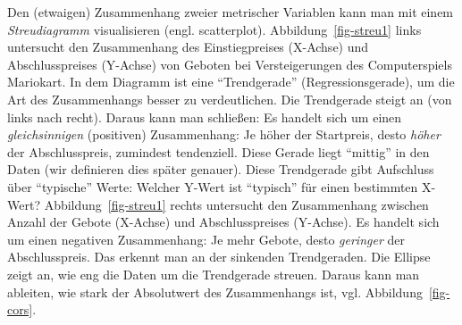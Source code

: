 \documentclass[
  letterpaper,
  oneside,
  open=any]{scrbook}
\theoremstyle{definition}
\theoremstyle{definition}
\theoremstyle{definition}
\theoremstyle{remark}
\begin{document}
Den (etwaigen) Zusammenhang zweier metrischer Variablen kann man mit
einem \emph{Streudiagramm} visualisieren (engl. scatterplot).
Abbildung~\ref{fig-streu1} links untersucht den Zusammenhang des
Einstiegpreises (X-Achse) und Abschlusspreises (Y-Achse) von Geboten bei
Versteigerungen des Computerspiels Mariokart. In dem Diagramm ist eine
\enquote{Trendgerade} (Regressionsgerade), um die Art des Zusammenhangs
besser zu verdeutlichen. Die Trendgerade steigt an (von links nach
recht). Daraus kann man schließen: Es handelt sich um einen
\emph{gleichsinnigen} (positiven) Zusammenhang: Je höher der Startpreis,
desto \emph{höher} der Abschlusspreis, zumindest tendenziell. Diese
Gerade liegt \enquote{mittig} in den Daten (wir definieren dies später
genauer). Diese Trendgerade gibt Aufschluss über \enquote{typische}
Werte: Welcher Y-Wert ist \enquote{typisch} für einen bestimmten X-Wert?
Abbildung~\ref{fig-streu1} rechts untersucht den Zusammenhang zwischen
Anzahl der Gebote (X-Achse) und Abschlusspreises (Y-Achse). Es handelt
sich um einen negativen Zusammenhang: Je mehr Gebote, desto
\emph{geringer} der Abschlusspreis. Das erkennt man an der sinkenden
Trendgeraden. Die Ellipse zeigt an, wie eng die Daten um die Trendgerade
streuen. Daraus kann man ableiten, wie stark der Absolutwert des
Zusammenhangs ist, vgl. Abbildung~\ref{fig-cors}.
\end{document}
